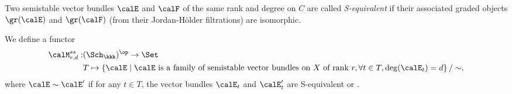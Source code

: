     \begin{definition}[S-equivalence]\label{def:S-equivalence}
        Two semistable vector bundles \(\calE\) and \(\calF\) of the same rank and degree on \(C\) are called \emph{S-equivalent} 
        if their associated graded objects \(\gr(\calE)\) and \(\gr(\calF)\) (from their Jordan-H\"older filtrations) are isomorphic.
    \end{definition}


    \begin{definition}\label{def:coarse_moduli_functor_of_vector_bundles}
        We define a functor 
        \begin{align*}
            \calM_{r,d}^{ss} : & (\Sch_\kkk)^{\op} \to \Set \\
            & T \mapsto \left\{ 
                \calE 
            \;\middle|\;
                \calE \text{ is a family of semistable vector bundles on } X \text{ of rank } r, \forall t \in T, \deg(\calE_t) = d
            \right\}/ \sim,
        \end{align*}
        where \(\calE \sim \calE'\) if for any \(t \in T\), the vector bundles \(\calE_t\) and \(\calE'_t\) are S-equivalent or .
    \end{definition}